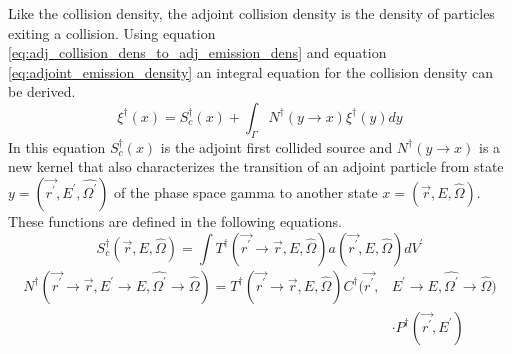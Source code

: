 Like the collision density, the adjoint collision density is the density of
particles exiting a collision. Using equation 
\ref{eq:adj_collision_dens_to_adj_emission_dens} and equation 
\ref{eq:adjoint_emission_density} an integral equation for the collision 
density can be derived.
\begin{equation}
  \xi^{\dagger}(x) = S_c^{\dagger}(x) + \int_{\Gamma} N^{\dagger}(y \to x)
  \xi^{\dagger}(y) dy
  \label{eq:adj_collision_dens_fiesk}
\end{equation}
In this equation $S_c^{\dagger}(x)$ is the adjoint first collided source and
$N^{\dagger}(y \to x)$ is a new kernel that also characterizes the transition
of an adjoint particle from state $y = (\vec{r^{'}},E^{'},\hat{\Omega^{'}})$ of
the phase space gamma to another state $x = (\vec{r},E,\hat{\Omega})$. These
functions are defined in the following equations.
\begin{equation}
  S_c^{\dagger}(\vec{r},E,\hat{\Omega}) = \int 
  T^{\dagger}(\vec{r^{'}} \to \vec{r},E,\hat{\Omega}) a(\vec{r^{'}},E,\hat{\Omega})
  dV^{'}
\end{equation}
\begin{equation}
  \begin{split}
    N^{\dagger}(\vec{r^{'}} \to \vec{r},E^{'} \to E,\hat{\Omega^{'}} \to \hat{\Omega})
    = T^{\dagger}(\vec{r^{'}} \to \vec{r},E,\hat{\Omega})
    C^{\dagger}(\vec{r^{'}},&E^{'} \to E,\hat{\Omega^{'}} \to \hat{\Omega}) \\
    & \cdot P^{\dagger}(\vec{r^{'}},E^{'}) 
  \end{split}
\end{equation}

